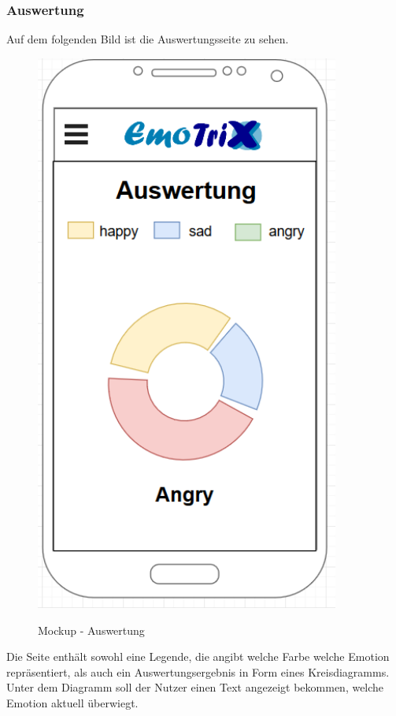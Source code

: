 \subsubsection{Auswertung}
Auf dem folgenden Bild ist die Auswertungsseite zu sehen.
\begin{figure}[h]
	\centering
	\includegraphics[width=10cm]{Bilder/Mockup-Auswertung.png}
	\label{img:Mockup-Auswertung}
	\caption[Mockup - Auswertung]{Mockup - Auswertung}
\end{figure}%
Die Seite enthält sowohl eine Legende, die angibt welche Farbe welche Emotion repräsentiert, als auch ein Auswertungsergebnis in Form eines Kreisdiagramms. Unter dem Diagramm soll der Nutzer einen Text angezeigt bekommen, welche Emotion aktuell überwiegt.
